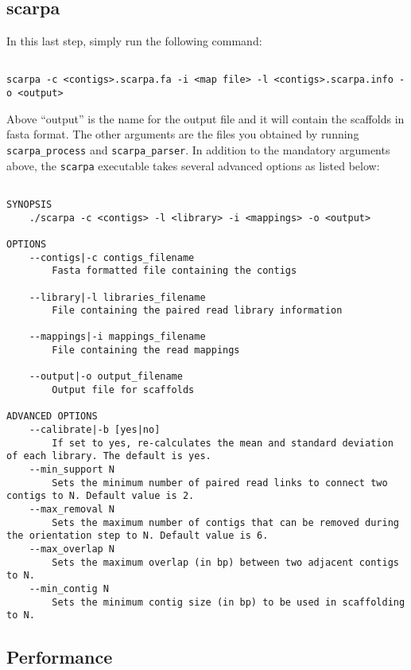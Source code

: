 \documentclass[12pt,a4paper]{report}
\begin{document}
\subsection{scarpa}

In this last step, simply run the following command:

\begin{lstlisting}

scarpa -c <contigs>.scarpa.fa -i <map file> -l <contigs>.scarpa.info -o <output>

\end{lstlisting}

Above ``output'' is the name for the output file and it will contain the scaffolds in fasta format. The other arguments are the files you obtained by running \texttt{scarpa\_process} and \texttt{scarpa\_parser}. In addition to the mandatory arguments above, the \texttt{scarpa} executable takes several advanced options as listed below:

\begin{lstlisting}

SYNOPSIS
    ./scarpa -c <contigs> -l <library> -i <mappings> -o <output> 

OPTIONS 
    --contigs|-c contigs_filename 
        Fasta formatted file containing the contigs 

    --library|-l libraries_filename 
        File containing the paired read library information 

    --mappings|-i mappings_filename 
        File containing the read mappings 

    --output|-o output_filename 
        Output file for scaffolds 

ADVANCED OPTIONS 
    --calibrate|-b [yes|no] 
        If set to yes, re-calculates the mean and standard deviation of each library. The default is yes. 
    --min_support N 
        Sets the minimum number of paired read links to connect two contigs to N. Default value is 2. 
    --max_removal N 
        Sets the maximum number of contigs that can be removed during the orientation step to N. Default value is 6. 
    --max_overlap N 
        Sets the maximum overlap (in bp) between two adjacent contigs to N. 
    --min_contig N 
        Sets the minimum contig size (in bp) to be used in scaffolding to N. 

\end{lstlisting}

\subsection{Performance}
\end{document}

